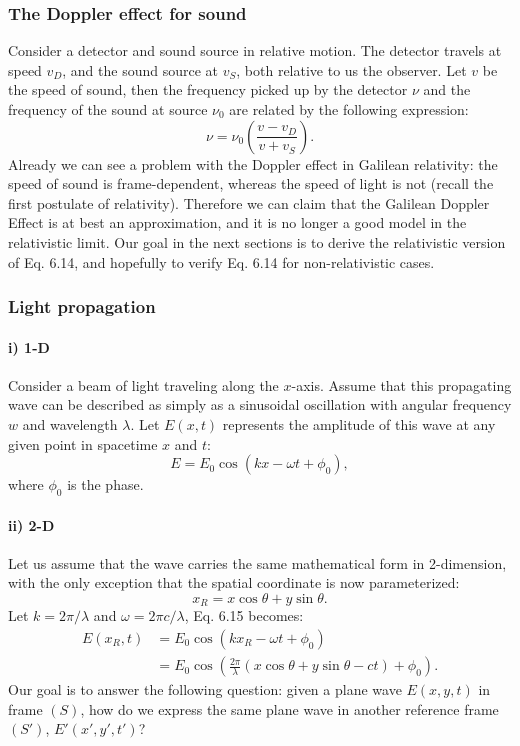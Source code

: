 \documentclass[a4paper,11pt]{article}
\numberwithin{equation}{section}
\begin{document}
 \subsubsection{The Doppler effect for sound}
 Consider a detector and sound source in relative motion. The detector travels at speed $v_D$, and the sound source at $v_S$, both relative to us the observer. Let $v$ be the speed of sound, then the frequency picked up by the detector $\nu$ and the frequency of the sound at source $\nu_0$ are related by the following expression: 
 \begin{equation}
 \nu=\nu_0\left( \frac{v - v_D}{v + v_S}\right). 
 \end{equation}
 Already we can see a problem with the Doppler effect in Galilean relativity: the speed of sound is frame-dependent, whereas the speed of light is not (recall the first postulate of relativity). Therefore we can claim that the Galilean Doppler Effect is at best an approximation, and it is no longer a good model in the relativistic limit. Our goal in the next sections is to derive the relativistic version of Eq. 6.14, and hopefully to verify Eq. 6.14 for non-relativistic cases.
 
 \subsubsection{Light propagation}
 \paragraph{i) 1-D \\}
 \noindent Consider a beam of light traveling along the $x$-axis. Assume that this propagating wave can be described as simply as a sinusoidal oscillation with angular frequency $w$ and wavelength $\lambda$. Let $E(x,t)$ represents the amplitude of this wave at any given point in spacetime $x$ and $t$:
 \begin{equation}
 E=E_0\cos(kx-\omega t+\phi_0),
 \end{equation}
 where $\phi_0$ is the phase. 
 \paragraph{ii) 2-D \\}
 \noindent Let us assume that the wave carries the same mathematical form in 2-dimension, with the only exception that the spatial coordinate is now parameterized:
 \begin{equation}
 x_R=x\cos\theta + y\sin\theta.
 \end{equation}
 Let $k=2\pi/\lambda$ and $\omega = 2\pi c/\lambda$, Eq. 6.15 becomes:
 \begin{equation}
 \begin{split}
 E(x_R,t) &= E_0\cos(kx_R-\omega t + \phi_0) \\
 &= E_0\cos\left(\frac{2\pi}{\lambda}\left(x\cos\theta + y\sin\theta - ct \right) + \phi_0 \right).
 \end{split}
 \end{equation}
 Our goal is to answer the following question: given a plane wave $E(x,y,t)$ in frame $(S)$, how do we express the same plane wave in another reference frame $(S')$, $E'(x',y',t')$? 
 
\end{document}
